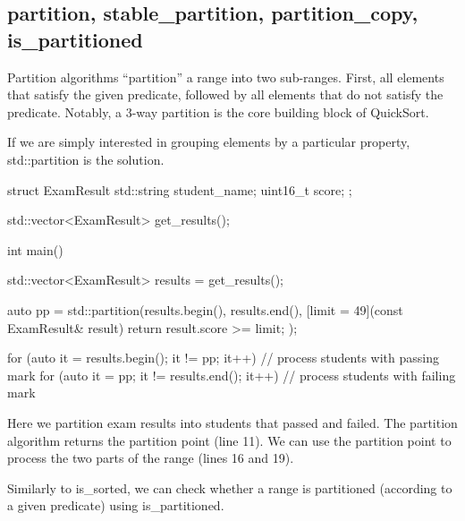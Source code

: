 \subsection{partition, stable\_partition, partition\_copy, is\_partitioned}

Partition algorithms “partition” a range into two sub-ranges. First, all elements that satisfy the given predicate, followed by all elements that do not satisfy the predicate. Notably, a 3-way partition is the core building block of QuickSort.



If we are simply interested in grouping elements by a particular property, std::partition is the solution.

\begin{box-note}
\begin{cppcode}
struct ExamResult {
    std::string student_name;
    uint16_t score;
};

std::vector<ExamResult> get_results();

int main() {
    std::vector<ExamResult> results = get_results();
  
    auto pp = std::partition(results.begin(), results.end(), 
        [limit = 49](const ExamResult& result) {
            return result.score >= limit;
        });
 
    for (auto it = results.begin(); it != pp; it++) {
        // process students with passing mark
    }
    for (auto it = pp; it != results.end(); it++) {
        // process students with failing mark
     }
}
\end{cppcode}
\end{box-note}

Here we partition exam results into students that passed and failed. The partition algorithm returns the partition point (line 11). We can use the partition point to process the two parts of the range (lines 16 and 19).

Similarly to is\_sorted, we can check whether a range is partitioned (according to a given predicate) using is\_partitioned.



\begin{box-note}
\end{box-note}

